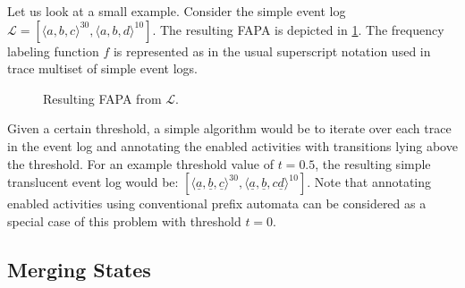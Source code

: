 Let us look at a small example. Consider the simple event log $\mathcal{L} = [\langle a, b, c \rangle^{30}, \langle a, b, d \rangle^{10}]$. The resulting FAPA is depicted in \ref{fig:fapa}. The frequency labeling function $f$ is represented as in the usual superscript notation used in trace multiset of simple event logs.


\begin{figure}[h!]
    \centering
    \caption{Resulting FAPA from $\mathcal{L}$.}
    \label{fig:fapa}
\end{figure}

Given a certain threshold, a simple algorithm would be to iterate over each trace in the event log and annotating the enabled activities with transitions lying above the threshold. For an example threshold value of $t = 0.5$, the resulting simple translucent event log would be: $[\langle \underline{a}, \underline{b}, \underline{c} \rangle^{30}, \langle \underline{a}, \underline{b}, c\underline{d}\rangle^{10}]$. Note that annotating enabled activities using conventional prefix automata can be considered as a special case of this problem with threshold $t = 0$.

\subsection{Merging States}

